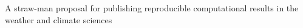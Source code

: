 A straw-man proposal for publishing reproducible computational results in the weather and climate sciences